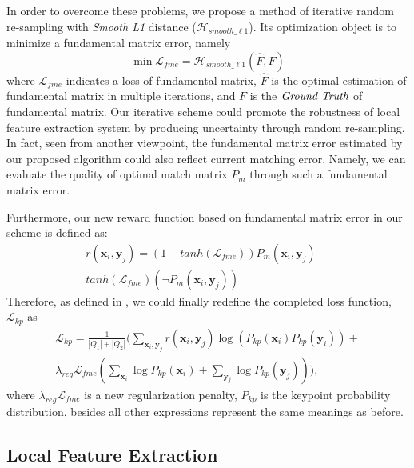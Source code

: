 \documentclass[journal]{IEEEtran}
\begin{document}
In order to overcome these problems, we propose a method of iterative random re-sampling with \emph{\rm Smooth L1} distance ($\mathcal{H}_{smooth\_\ell 1}$). Its optimization object is to minimize a fundamental matrix error, namely  
\begin{equation}\label{10}
        \mathop{\min} \mathcal{L}_{fme}=
\mathcal{H}_{smooth\_\ell 1}(\hat{F},F)
\end{equation}
where $\mathcal{L}_{fme}$ indicates a loss of fundamental matrix, $\hat{F}$ is the optimal estimation of fundamental matrix in multiple iterations, 
and $F$ is the $\emph{Ground Truth}$ of fundamental matrix. 
Our iterative scheme could promote the robustness of local feature extraction system by producing uncertainty through random re-sampling. In fact, seen from another viewpoint, the fundamental matrix error estimated by our proposed algorithm could also reflect current matching error. Namely, we can evaluate the quality of optimal match matrix $P_{m}$ through such a fundamental matrix error. 


Furthermore, our new reward function based on fundamental matrix error in our scheme is defined as:
\begin{multline}\label{11}
        r(\boldsymbol{x}_i,\boldsymbol{y}_j)=(1-tanh(\mathcal{L}_{fme}))P_{m}(\boldsymbol{x}_i,\boldsymbol{y}_j)-\\tanh(\mathcal{L}_{fme})(\neg P_{m}(\boldsymbol{x}_i,\boldsymbol{y}_j))
\end{multline}
Therefore, as defined in \cite{li2022decoupling}, we could finally redefine the completed loss function, $\mathcal{L}_{kp}$ as
\begin{multline}\label{12}
        \mathcal{L}_{kp}=\frac{1}{|Q_1|+|Q_2|}(\mathop{\sum}\limits_{\boldsymbol{x}_i,\boldsymbol{y}_j}{r(\boldsymbol{x}_{i},\boldsymbol{y}_{j})\log {(P_{kp}(\boldsymbol{x}_i)P_{kp}(\boldsymbol{y}_i))}} +\\
        \lambda_{reg}\mathcal{L}_{fme}(\mathop{\sum}\limits_{\boldsymbol{x}_i}{\log{P_{kp}(\boldsymbol{x}_i)}}+\mathop{\sum}\limits_{\boldsymbol{y}_j}{\log{P_{kp}(\boldsymbol{y}_j)}})),
\end{multline}
where $\lambda_{reg}\mathcal{L}_{fme}$ is a new regularization penalty, $P_{kp}$ is the keypoint probability distribution, besides all other expressions represent the same meanings as before.


\subsection{Local Feature Extraction}
\end{document}
